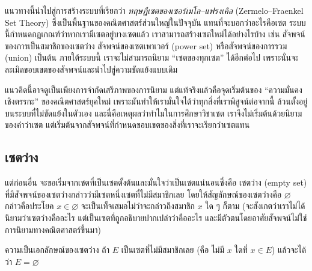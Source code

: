 แนวทางนี้นำไปสู่การสร้างระบบที่เรียกว่า \textit{ทฤษฎีเซตของเซอร์เมโล–แฟรงเคิล} (Zermelo–Fraenkel Set Theory) ซึ่งเป็นพื้นฐานของคณิตศาสตร์ส่วนใหญ่ในปัจจุบัน แทนที่จะบอกว่าอะไรคือเซต ระบบนี้กำหนดกฎเกณฑ์ว่าหากเรามีเซตอยู่บางเซตแล้ว เราสามารถสร้างเซตใหม่ได้อย่างไรบ้าง เช่น สัจพจน์ของการเป็นสมาชิกของเซตว่าง สัจพจน์ของเซตเพาเวอร์ (power set) หรือสัจพจน์ของการรวม (union) เป็นต้น ภายใต้ระบบนี้ เราจะไม่สามารถนิยาม “เซตของทุกเซต” ได้อีกต่อไป เพราะนั่นจะละเมิดขอบเขตของสัจพจน์และนำไปสู่ความขัดแย้งแบบเดิม

แนวคิดนี้อาจดูเป็นเพียงการจำกัดเสรีภาพของการนิยาม แต่แท้จริงแล้วคือจุดเริ่มต้นของ “ความมั่นคงเชิงตรรกะ” ของคณิตศาสตร์ยุคใหม่ เพราะมันทำให้เรามั่นใจได้ว่าทุกสิ่งที่เราพิสูจน์ต่อจากนี้ ล้วนตั้งอยู่บนระบบที่ไม่ขัดแย้งในตัวเอง%
และนี่คือเหตุผลว่าทำไมในการศึกษาวิชาเซต เราจึงไม่เริ่มต้นด้วยนิยามของคำว่าเซต แต่เริ่มต้นจากสัจพจน์ที่กำหนดขอบเขตของสิ่งที่เราจะเรียกว่าเซตแทน

\newpage
\subsection{เซตว่าง}
แต่ก่อนอื่น จะขอเริ่มจากเซตที่เป็นเซตตั้งต้นและมั่นใจว่าเป็นเซตแน่นอนซึ่งคือ เซตว่าง (empty set) ที่มีสัจพจน์ของเซตว่างกล่าวว่ามีเซตหนึ่งเซตที่ไม่มีสมาชิกเลย โดยให้สัญลักษณ์ของเซตว่างคือ $\varnothing$ กล่าวคือประโยค $x\in\varnothing$ จะเป็นเท็จเสมอไม่ว่าจะกล่าวถึงสมาชิก $x$ ใด ๆ ก็ตาม (จะสังเกตว่าเราไม่ได้นิยามว่าเซตว่างคืออะไร แต่เป็นเซตที่ถูกอธิบายปากเปล่าว่าคืออะไร และมีตัวตนโดยอาศัยสัจพจน์ไม่ใช่การนิยามทางคณิตศาสตร์ขึ้นมา)

\begin{prop}{ความเป็นเอกลักษณ์ของเซตว่าง}{}
	ถ้า $E$ เป็นเซตที่ไม่มีสมาชิกเลย (คือ ไม่มี $x$ ใดที่ $x \in E$) แล้วจะได้ว่า $E = \varnothing$
\end{prop}
%	
%	
%	
\newpage
